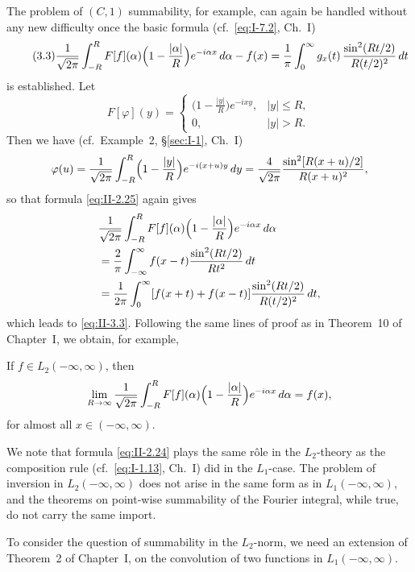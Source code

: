 The problem of $(C,1)$ summability, for example, can again be handled without any new difficulty once the basic formula (cf.\ \eqref{eq:I-7.2}, Ch.~I)
\begin{equation}\tag{3.3}\label{eq:II-3.3}
\frac{1}{\sqrt{2\pi}}\int_{-R}^{R}F[f](\alpha)\Bigl(1-\frac{|\alpha|}{R}\Bigr)e^{-i\alpha x}\,d\alpha-f(x)
=\frac{1}{\pi}\int_{0}^{\infty}g_{x}(t)\,\frac{\sin^{2}(Rt/2)}{R(t/2)^{2}}\,dt
\end{equation}
is established. Let
\[
F[\varphi](y)=
\begin{cases}
\bigl(1-\frac{|y|}{R}\bigr)e^{-ixy}, & |y|\le R,\\
0, & |y|>R.
\end{cases}
\]
Then we have (cf.\ Example~2, \S\ref{sec:I-1}, Ch.~I)
\[
\varphi(u)=\frac{1}{\sqrt{2\pi}}\int_{-R}^{R}\Bigl(1-\frac{|y|}{R}\Bigr)e^{-i(x+u)y}\,dy
=\frac{4}{\sqrt{2\pi}}\frac{\sin^{2}[R(x+u)/2]}{R(x+u)^{2}},
\]
so that formula \eqref{eq:II-2.25} again gives
\[
\begin{aligned}
&\frac{1}{\sqrt{2\pi}}\int_{-R}^{R}F[f](\alpha)\Bigl(1-\frac{|\alpha|}{R}\Bigr)e^{-i\alpha x}\,d\alpha\\
&= \frac{2}{\pi}\int_{-\infty}^{\infty}f(x-t)\frac{\sin^{2}(Rt/2)}{Rt^{2}}\,dt\\
&= \frac{1}{2\pi}\int_{0}^{\infty}[f(x+t)+f(x-t)]\frac{\sin^{2}(Rt/2)}{R(t/2)^{2}}\,dt,
\end{aligned}
\]
which leads to \eqref{eq:II-3.3}. Following the same lines of proof as in Theorem~10 of Chapter~I, we obtain, for example,

\begin{theorem}\label{thm:II-3}
If $f\in L_{2}(-\infty,\infty)$, then
\[
\lim_{R\to\infty}\frac{1}{\sqrt{2\pi}}\int_{-R}^{R}F[f](\alpha)\Bigl(1-\frac{|\alpha|}{R}\Bigr)e^{-i\alpha x}\,d\alpha=f(x),
\]
for almost all $x\in(-\infty,\infty)$.
\end{theorem}

We note that formula \eqref{eq:II-2.24} plays the same r\^ole in the $L_{2}$-theory as the composition rule (cf.\ \eqref{eq:I-1.13}, Ch.~I) did in the $L_{1}$-case. The problem of inversion in $L_{2}(-\infty,\infty)$ does not arise in the same form as in $L_{1}(-\infty,\infty)$, and the theorems on point-wise summability of the Fourier integral, while true, do not carry the same import.

To consider the question of summability in the $L_{2}$-norm, we need an extension of Theorem~2 of Chapter~I, on the convolution of two functions in $L_{1}(-\infty,\infty)$.

